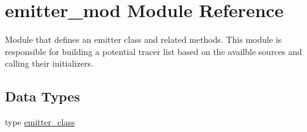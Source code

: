\hypertarget{namespaceemitter__mod}{}\section{emitter\+\_\+mod Module Reference}
\label{namespaceemitter__mod}


Module that defines an emitter class and related methods. This module is responsible for building a potential tracer list based on the availble sources and calling their initializers.  


\subsection*{Data Types}
\begin{DoxyCompactItemize}
\item 
type \hyperlink{structemitter__mod_1_1emitter__class}{emitter\+\_\+class}
\end{DoxyCompactItemize}
